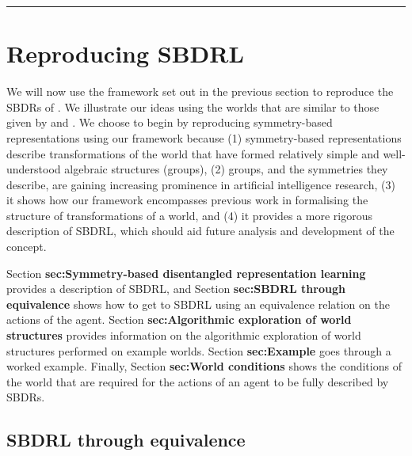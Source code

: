 





\noindent\rule{\textwidth}{1mm}
\section{Reproducing SBDRL}\label{sec:Reproducing SBDRL}

We will now use the framework set out in the previous section to reproduce the SBDRs of \cite{Higgins2018}.
We illustrate our ideas using the worlds that are similar to those given by \cite{Higgins2018} and \cite{caselles2019symmetry}.
We choose to begin by reproducing symmetry-based representations using our framework because (1) symmetry-based representations describe transformations of the world that have formed relatively simple and well-understood algebraic structures (groups), (2) groups, and the symmetries they describe, are gaining increasing prominence in artificial intelligence research, (3) it shows how our framework encompasses previous work in formalising the structure of transformations of a world, and (4) it provides a more rigorous description of SBDRL, which should aid future analysis and development of the concept.

Section \textbf{sec:Symmetry-based disentangled representation learning} provides a description of SBDRL, and Section \textbf{sec:SBDRL through equivalence} shows how to get to SBDRL using an equivalence relation on the actions of the agent.
Section \textbf{sec:Algorithmic exploration of world structures} provides information on the algorithmic exploration of world structures performed on example worlds.
Section \textbf{sec:Example} goes through a worked example.
Finally, Section \textbf{sec:World conditions} shows the conditions of the world that are required for the actions of an agent to be fully described by SBDRs.



\subsection{SBDRL through equivalence}\label{sec:SBDRL through equivalence}


